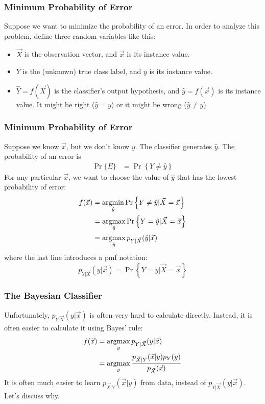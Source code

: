 \documentclass{beamer}
\newcommand{\argmax}{\operatornamewithlimits{argmax}}
\newcommand{\argmin}{\operatornamewithlimits{argmin}}
\begin{document}
\begin{frame}
  \frametitle{Minimum Probability of Error}

  Suppose we want to minimize the probability of an error.  In order
  to analyze this problem, define three random variables like this:
  \begin{itemize}
  \item
    $\vec{X}$ is the observation vector, and $\vec{x}$ is its instance value.
  \item
    $Y$ is the (unknown) true class label, and $y$ is its instance value.
  \item
    $\hat{Y}=f(\vec{X})$ is the classifier's output hypothesis, and $\hat{y}=f(\vec{x})$ is
    its instance value.  It might be right ($\hat{y}=y$)  or it might be wrong
    ($\hat{y}\ne y$).
  \end{itemize}
\end{frame}

\begin{frame}
  \frametitle{Minimum Probability of Error}

  Suppose we know $\vec{x}$, but we don't know $y$.  The classifier
  generates $\hat{y}$.  The probability of an error is
  \begin{align*}
    \Pr\{E\} &= \Pr\left\{Y \ne \hat{y}\right\}
  \end{align*}
  For any particular $\vec{x}$, we want to choose the value of $\hat{y}$
  that has the lowest probability of error:
  \begin{align*}
    f(\vec{x}) &= \argmin_{\hat{y}} \Pr\left\{Y \ne \hat{y}|\vec{X}=\vec{x}\right\}\\
    &= \argmax_{\hat{y}} \Pr\left\{Y = \hat{y}|\vec{X}=\vec{x}\right\}\\
    &= \argmax_{\hat{y}} p_{Y|\vec{X}}(\hat{y}|\vec{x})
  \end{align*}
  where the last line introduces a pmf notation:
  \[
  p_{Y|\vec{X}}(y|\vec{x}) = \Pr\left\{Y=y|\vec{X}=\vec{x}\right\}
  \]
\end{frame}
    
\begin{frame}
  \frametitle{The Bayesian Classifier}

  Unfortunately, $p_{Y|\vec{X}}(y|\vec{x})$ is often very hard to
  calculate directly.  Instead, it is often easier to calculate it
  using Bayes' rule:
  \begin{align*}
    f(\vec{x}) &= \argmax_y p_{Y|\vec{X}}(y|\vec{x})\\
    &= \argmax_y \frac{p_{\vec{X}|Y}(\vec{x}|y)p_Y(y)}{p_{\vec{X}}(\vec{x})}
  \end{align*}
  It is often much easier to learn $p_{\vec{X}|Y}(\vec{x}|y)$ from data, instead of
  $p_{Y|\vec{X}}(y|\vec{x})$.  Let's discuss why.
\end{frame}
\end{document}
